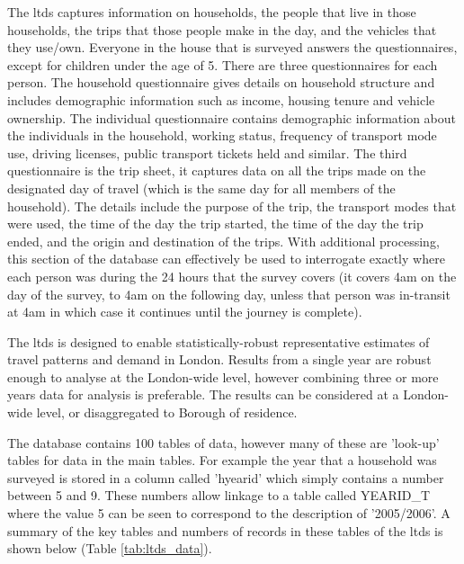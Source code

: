 The \gls{ltds} captures information on households, the people that live in those households, the trips that those people make in the day, and the vehicles that they use/own. Everyone in the house that is surveyed answers the questionnaires, except for children under the age of 5. There are three questionnaires for each person. The household questionnaire gives details on household structure and includes demographic information such as income, housing tenure and vehicle ownership. The individual questionnaire contains demographic information about the individuals in the household, working status, frequency of transport mode use, driving licenses, public transport tickets held and similar. The third questionnaire is the trip sheet, it captures data on all the trips made on the designated day of travel (which is the same day for all members of the household). The details include the purpose of the trip, the transport modes that were used, the time of the day the trip started, the time of the day the trip ended, and the origin and destination of the trips. With additional processing, this section of the database can effectively be used to interrogate exactly where each person was during the 24 hours that the survey covers (it covers 4am on the day of the survey, to 4am on the following day, unless that person was in-transit at 4am in which case it continues until the journey is complete).

The \gls{ltds} is designed to enable statistically-robust representative estimates of travel patterns and demand in London. Results from a single year are robust enough to analyse at the London-wide level, however combining three or more years data for analysis is preferable. The results can be considered at a London-wide level, or disaggregated to Borough of residence.

The database contains 100 tables of data, however many of these are 'look-up' tables for data in the main tables. For example the year that a household was surveyed is stored in a column called 'hyearid' which simply contains a number between 5 and 9. These numbers allow linkage to a table called YEARID\_T where the value 5 can be seen to correspond to the description of '2005/2006'. A summary of the key tables and numbers of records in these tables of the \gls{ltds} is shown below (Table \ref{tab:ltds_data}).

